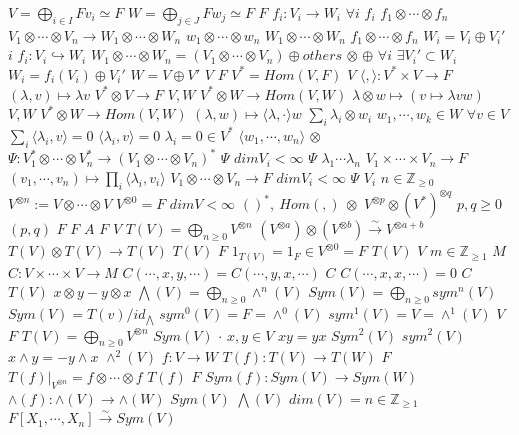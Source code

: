 \documentclass{article}
\begin{document}
$V = \bigoplus_{i \in I} Fv_i \simeq F$
$W=\bigoplus_{j \in J} Fw_j \simeq F$
$F$
$f_i:V_i \rightarrow W_i$
$\forall i$
$f_i$
$f_1 \otimes \cdots \otimes f_n$
$V_1\otimes\cdots\otimes V_n \rightarrow W_1\otimes\cdots\otimes W_n$
$w_1\otimes\cdots\otimes w_n$
$W_1\otimes\cdots\otimes W_n$
$f_1\otimes\cdots\otimes f_n$
$W_i=V_i \oplus V_i'$
$i$
$f_i:V_i \hookrightarrow W_i$
$W_1\otimes\cdots\otimes W_n=(V_1\otimes\cdots\otimes V_n) \oplus others$
$\otimes$
$\oplus$
$\forall i$
$\exists V_i' \subset W_i$
$W_i=f_i(V_i) \oplus V_i'$
$W=V \oplus V'$
$V$
$F$
$V^*=Hom(V,F)$
$V$
$\langle,\rangle:V^* \times V \rightarrow F$
$(\lambda,v)\mapsto \lambda v$
$V^* \otimes V \rightarrow F$
$V,W$
$V^* \otimes W \rightarrow Hom(V,W)$
$\lambda \otimes w \mapsto (v \mapsto \lambda v w)$
$V,W$
$V^* \otimes W \rightarrow Hom(V,W)$
$(\lambda,w) \mapsto \langle \lambda, \cdot \rangle w$
$\sum_i\lambda_i \otimes w_i$
$w_1,\cdots,w_k \in W$
$\forall v \in V$
$\sum_i\langle \lambda_i,v\rangle=0$
$\langle\lambda_i,v\rangle=0$
$\lambda_i=0 \in V^*$
$\langle w_1,\cdots,w_n \rangle$
$\otimes$
$\Psi:V^*_1\otimes\cdots\otimes V^*_n \rightarrow (V_1\otimes\cdots\otimes V_n)^*$
$\Psi$
$dimV_i< \infty$
$\Psi$
$\lambda_1\cdots \lambda_n$
$V_1 \times \cdots \times V_n \rightarrow F$
$(v_1,\cdots,v_n) \mapsto \prod_i \langle \lambda_i,v_i \rangle$
$V_1\otimes\cdots\otimes V_n \rightarrow F$
$dimV_i<\infty$
$\Psi$
$V_i$
$n \in \mathbb{Z}_{\geq 0}$
$V^{\otimes n}:=V \otimes \cdots \otimes V$
$V^{\otimes 0}=F$
$dimV < \infty$
$()^*,\ Hom(,) \ \otimes$
$V^{\otimes p} \otimes (V^*)^{\otimes q}$
$p,q \geq 0$
$(p,q)$
$F$
$F$
$A$
$F$
$V$
$T(V)=\bigoplus_{n \geq 0}V^{\otimes n}$
$(V^{\otimes a}) \otimes (V^{\otimes b}) \stackrel{\sim}{\longrightarrow} V^{\otimes a+b}$
$T(V) \otimes T(V) \rightarrow T(V)$
$T(V)$
$F$
$1_{T(V)}=1_F \in V^{\otimes 0}=F$
$T(V)$
$V$
$m \in \mathbb{Z}_{\geq 1}$
$M$
$C:V \times \cdots \times V \rightarrow M$
$C(\cdots,x,y,\cdots)=C(\cdots,y,x,\cdots)$
$C$
$C(\cdots,x,x,\cdots)=0$
$C$
$T(V)$
$x \otimes y-y \otimes x$
$\bigwedge(V)=\bigoplus_{n \geq 0} \wedge^n(V)$
$Sym(V)=\bigoplus_{n \geq 0} sym^n(V)$
$Sym(V)=T(v)/id_{\bigwedge}$
$sym^0(V)=F=\wedge^0(V)$
$sym^1(V)=V=\wedge^1(V)$
$V$
$F$
$T(V)=\bigoplus_{n \geq 0}V^{\otimes n}$
$Sym(V)$
$\cdot$
$x,y \in V$
$xy=yx$
$Sym^2(V)$
$sym^2(V)$
$x \wedge y= -y \wedge x$
$\wedge^2(V)$
$f:V \rightarrow W$
$T(f):T(V) \rightarrow T(W)$
$F$
$T(f)|_{V^{\otimes n}}=f \otimes \cdots \otimes f$
$T(f)$
$F$
$Sym(f):Sym(V) \rightarrow Sym(W)$
$\wedge (f): \wedge(V) \rightarrow \wedge(W)$
$Sym(V)$
$\bigwedge(V)$
$dim(V)=n \in \mathbb{Z}_{\geq 1}$
$F[X_1,\cdots,X_n] \stackrel{\sim}{\longrightarrow} Sym(V)$
\end{document}
